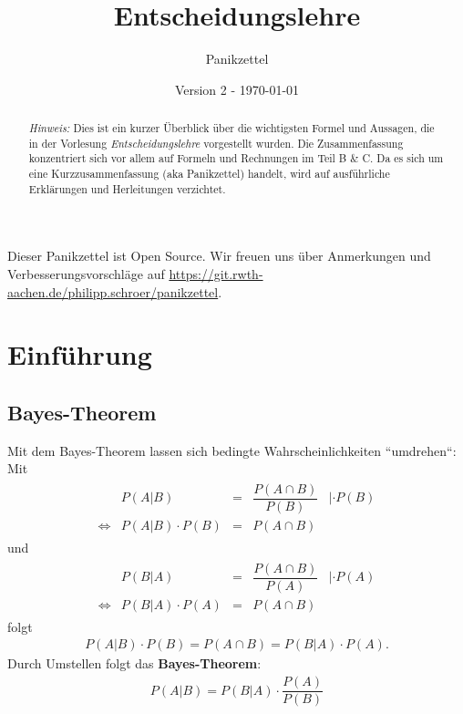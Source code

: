 \documentclass[12pt,a4paper]{scrartcl}
\author{}
\title{Entscheidungslehre}
\subtitle{Panikzettel}
\author{\authors}
\date{\small Version 2 - \today}
\begin{document}
\maketitle

\begin{abstract}
	\textit{Hinweis:} Dies ist ein kurzer Überblick über die wichtigsten Formel und Aussagen, die in der Vorlesung \textit{Entscheidungslehre} \cite{vonNitzsch:skript} vorgestellt wurden. Die Zusammenfassung konzentriert sich vor allem auf Formeln und Rechnungen im Teil B \& C. Da es sich um eine Kurzzusammenfassung (aka Panikzettel) handelt, wird auf ausführliche Erklärungen und Herleitungen verzichtet.
\end{abstract}
Dieser Panikzettel ist Open Source.
Wir freuen uns über Anmerkungen und Verbesserungsvorschläge auf \url{https://git.rwth-aachen.de/philipp.schroer/panikzettel}.

\vspace{1cm}
\setcounter{tocdepth}{1}
\tableofcontents

\newpage
	
\section{Einführung}

\subsection{Bayes-Theorem}
Mit dem Bayes-Theorem lassen sich bedingte Wahrscheinlichkeiten ``umdrehen``:\\
Mit
\begin{align*}
\begin{array}{rrcll}
& P(A | B) & =  & \dfrac{P(A \cap B)}{P(B)} & |\cdot P(B) \\
\Leftrightarrow & P (A|B) \cdot P(B) & = & P(A \cap B)
\end{array}
\end{align*}
und 
\begin{align*}
\begin{array}{rrcll}
& P(B | A) & =  & \dfrac{P(A \cap B)}{P(A)} & |\cdot P(A) \\
\Leftrightarrow & P (B|A) \cdot P(A) & = & P(A \cap B)
\end{array}
\end{align*}
folgt
\begin{align*}
	P (A|B) \cdot P(B) = P(A \cap B) = P (B|A) \cdot P(A).
\end{align*}
Durch Umstellen folgt das \textbf{Bayes-Theorem}:
\begin{align*}
	P(A|B) = P(B|A) \cdot \dfrac{P(A)}{P(B)}
\end{align*}
\end{document}
